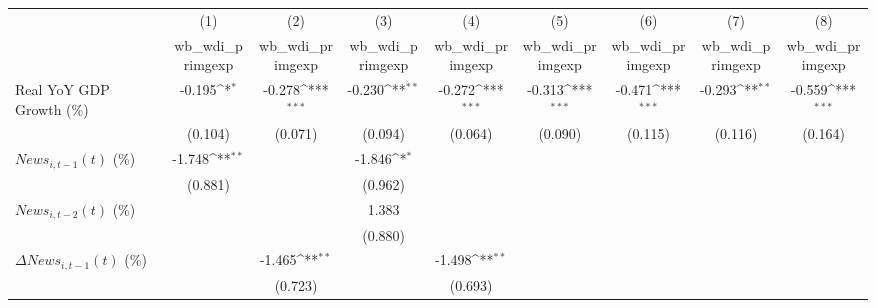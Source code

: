 {
\def\sym#1{\ifmmode^{#1}\else\(^{#1}\)\fi}
\begin{tabular}{l*{8}{c}}
\toprule
                    &\multicolumn{1}{c}{(1)}&\multicolumn{1}{c}{(2)}&\multicolumn{1}{c}{(3)}&\multicolumn{1}{c}{(4)}&\multicolumn{1}{c}{(5)}&\multicolumn{1}{c}{(6)}&\multicolumn{1}{c}{(7)}&\multicolumn{1}{c}{(8)}\\
                    &\multicolumn{1}{c}{wb_wdi_primgexp}&\multicolumn{1}{c}{wb_wdi_primgexp}&\multicolumn{1}{c}{wb_wdi_primgexp}&\multicolumn{1}{c}{wb_wdi_primgexp}&\multicolumn{1}{c}{wb_wdi_primgexp}&\multicolumn{1}{c}{wb_wdi_primgexp}&\multicolumn{1}{c}{wb_wdi_primgexp}&\multicolumn{1}{c}{wb_wdi_primgexp}\\
\midrule
Real YoY GDP Growth (\%)&      -0.195\sym{*}  &      -0.278\sym{***}&      -0.230\sym{**} &      -0.272\sym{***}&      -0.313\sym{***}&      -0.471\sym{***}&      -0.293\sym{**} &      -0.559\sym{***}\\
                    &     (0.104)         &     (0.071)         &     (0.094)         &     (0.064)         &     (0.090)         &     (0.115)         &     (0.116)         &     (0.164)         \\
\addlinespace
$ News_{i,t-1}(t)$ (\%)&      -1.748\sym{**} &                     &      -1.846\sym{*}  &                     &                     &                     &                     &                     \\
                    &     (0.881)         &                     &     (0.962)         &                     &                     &                     &                     &                     \\
\addlinespace
$ News_{i,t-2}(t)$ (\%)&                     &                     &       1.383         &                     &                     &                     &                     &                     \\
                    &                     &                     &     (0.880)         &                     &                     &                     &                     &                     \\
\addlinespace
$ \Delta News_{i,t-1}(t)$ (\%)&                     &      -1.465\sym{**} &                     &      -1.498\sym{**} &                     &                     &                     &                     \\
                    &                     &     (0.723)         &                     &     (0.693)         &                     &                     &                     &                     \\

\end{tabular}}
